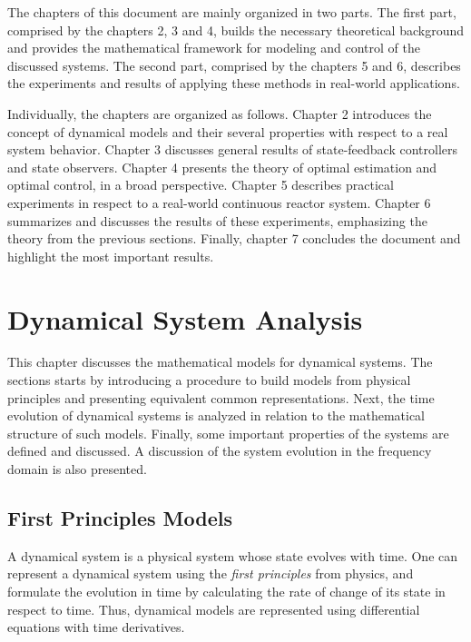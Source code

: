 \documentclass[a4paper,11pt]{book}
\numberwithin{figure}{chapter}
\numberwithin{equation}{chapter}
\numberwithin{table}{chapter}
\theoremstyle{definition}
\begin{document}
The chapters of this document are mainly organized in two parts. The first part, comprised by the chapters 2, 3 and 4, builds the necessary theoretical background and provides the mathematical framework for modeling and control of the discussed systems. The second part, comprised by the chapters 5 and 6, describes the experiments and results of applying these methods in real-world applications.

Individually, the chapters are organized as follows. Chapter 2 introduces the concept of dynamical models and their several properties with respect to a real system behavior. Chapter 3 discusses general results of state-feedback controllers and state observers. Chapter 4 presents the theory of optimal estimation and optimal control, in a broad perspective. Chapter 5 describes practical experiments in respect to a real-world continuous reactor system. Chapter 6 summarizes and discusses the results of these experiments, emphasizing the theory from the previous sections. Finally, chapter 7 concludes the document and highlight the most important results.


\clearpage
\chapter{Dynamical System Analysis}

This chapter discusses the mathematical models for dynamical systems. The sections starts by introducing a procedure to build models from physical principles and presenting equivalent common representations. Next, the time evolution of dynamical systems is analyzed in relation to the mathematical structure of such models. Finally, some important properties of the systems are defined and discussed. A discussion of the system evolution in the frequency domain is also presented.

\section{First Principles Models}

A dynamical system is a physical system whose state evolves with time. One can represent a dynamical system using the \textit{first principles} from physics, and formulate the evolution in time by calculating the rate of change of its state in respect to time. Thus, dynamical models are represented using differential equations with time derivatives. 
\end{document}

